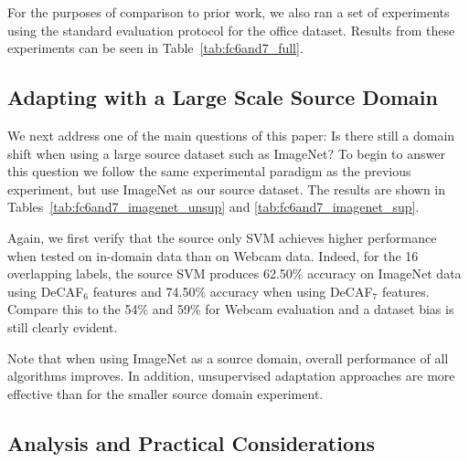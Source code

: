 For the purposes of comparison to prior work, we also ran a set of experiments
using the standard evaluation protocol for the office dataset.  Results from these experiments can be seen in
Table~\ref{tab:fc6and7_full}.


\subsection{Adapting with a Large Scale Source Domain}

We next address one of the main questions of this paper: Is there still a domain shift when using a large source dataset such as ImageNet? To begin to answer this question we follow the same experimental paradigm as the previous experiment, but use ImageNet as our source dataset. 
The results are shown in Tables~\ref{tab:fc6and7_imagenet_unsup} and \ref{tab:fc6and7_imagenet_sup}. %



Again, we first verify that the source only SVM achieves higher performance when tested on in-domain data than on Webcam data. 
Indeed, for the 16 overlapping labels, the source SVM produces 62.50\% accuracy on ImageNet data using DeCAF$_6$ features and 74.50\% accuracy when using DeCAF$_7$ features. 
Compare this to the 54\% and 59\% for Webcam evaluation and a dataset bias is still clearly evident.

Note that when using ImageNet as a source domain, overall performance of all algorithms improves. In addition, unsupervised adaptation approaches are more effective than for the smaller source domain experiment. 

\subsection{Analysis and Practical Considerations}
\label{sec:analysis}




